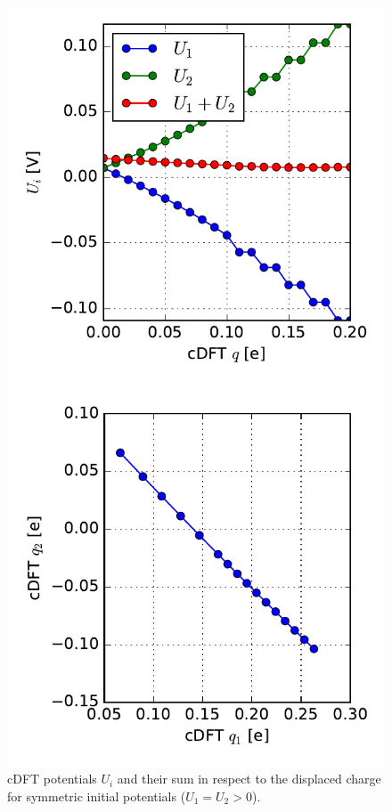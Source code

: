 \begin{figure}
\centering
\begin{minipage}{0.49\textwidth}
\centering
\includegraphics[width = \textwidth]{Images/Hydrogen/charging/Potential_asymmetry}
\caption{cDFT potentials $U_i$ and their sum in respect to the displaced charge for symmetric initial potentials \mbox{($U_1 = U_2 > 0$)}.}
\label{image_potential_asymmetrys}
\end{minipage}\hspace*{.5cm}
\begin{minipage}{0.49\textwidth}
\centering
\includegraphics[width = \textwidth]{Images/Hydrogen/charging/charge_correlation}

\end{minipage}
\end{figure}
